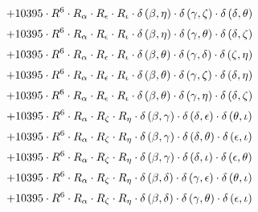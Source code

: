 \begin{subequations}
\begin{gather}
 \\[0.2em] \notag 		 + 10395 \cdot R^{6} \cdot R_{\alpha{}} \cdot R_{\epsilon{}} \cdot R_{\iota{}} \cdot \delta{}\left(\beta{}, \eta{}\right) \cdot \delta{}\left(\gamma{}, \zeta{}\right) \cdot \delta{}\left(\delta{}, \theta{}\right) 
 \\[0.2em] \notag 		 + 10395 \cdot R^{6} \cdot R_{\alpha{}} \cdot R_{\epsilon{}} \cdot R_{\iota{}} \cdot \delta{}\left(\beta{}, \eta{}\right) \cdot \delta{}\left(\gamma{}, \theta{}\right) \cdot \delta{}\left(\delta{}, \zeta{}\right) 
 \\[0.2em] \notag 		 + 10395 \cdot R^{6} \cdot R_{\alpha{}} \cdot R_{\epsilon{}} \cdot R_{\iota{}} \cdot \delta{}\left(\beta{}, \theta{}\right) \cdot \delta{}\left(\gamma{}, \delta{}\right) \cdot \delta{}\left(\zeta{}, \eta{}\right) 
 \\[0.2em] \notag 		 + 10395 \cdot R^{6} \cdot R_{\alpha{}} \cdot R_{\epsilon{}} \cdot R_{\iota{}} \cdot \delta{}\left(\beta{}, \theta{}\right) \cdot \delta{}\left(\gamma{}, \zeta{}\right) \cdot \delta{}\left(\delta{}, \eta{}\right) 
 \\[0.2em] \notag 		 + 10395 \cdot R^{6} \cdot R_{\alpha{}} \cdot R_{\epsilon{}} \cdot R_{\iota{}} \cdot \delta{}\left(\beta{}, \theta{}\right) \cdot \delta{}\left(\gamma{}, \eta{}\right) \cdot \delta{}\left(\delta{}, \zeta{}\right) 
 \\[0.2em] \notag 		 + 10395 \cdot R^{6} \cdot R_{\alpha{}} \cdot R_{\zeta{}} \cdot R_{\eta{}} \cdot \delta{}\left(\beta{}, \gamma{}\right) \cdot \delta{}\left(\delta{}, \epsilon{}\right) \cdot \delta{}\left(\theta{}, \iota{}\right) 
 \\[0.2em] \notag 		 + 10395 \cdot R^{6} \cdot R_{\alpha{}} \cdot R_{\zeta{}} \cdot R_{\eta{}} \cdot \delta{}\left(\beta{}, \gamma{}\right) \cdot \delta{}\left(\delta{}, \theta{}\right) \cdot \delta{}\left(\epsilon{}, \iota{}\right) 
 \\[0.2em] \notag 		 + 10395 \cdot R^{6} \cdot R_{\alpha{}} \cdot R_{\zeta{}} \cdot R_{\eta{}} \cdot \delta{}\left(\beta{}, \gamma{}\right) \cdot \delta{}\left(\delta{}, \iota{}\right) \cdot \delta{}\left(\epsilon{}, \theta{}\right) 
 \\[0.2em] \notag 		 + 10395 \cdot R^{6} \cdot R_{\alpha{}} \cdot R_{\zeta{}} \cdot R_{\eta{}} \cdot \delta{}\left(\beta{}, \delta{}\right) \cdot \delta{}\left(\gamma{}, \epsilon{}\right) \cdot \delta{}\left(\theta{}, \iota{}\right) 
 \\[0.2em] \notag 		 + 10395 \cdot R^{6} \cdot R_{\alpha{}} \cdot R_{\zeta{}} \cdot R_{\eta{}} \cdot \delta{}\left(\beta{}, \delta{}\right) \cdot \delta{}\left(\gamma{}, \theta{}\right) \cdot \delta{}\left(\epsilon{}, \iota{}\right) 

\end{gather}
\end{subequations}
